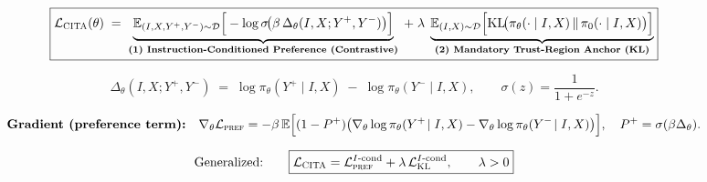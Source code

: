 


\vspace{-0.6em}
\begin{figure}[ht!]
\centering
\begin{tcolorbox}[
  enhanced,
  colback=white,
  colframe=black,
  boxrule=0.8pt,
  borderline={0.6pt}{1.6pt}{black},
  sharp corners,
  width=0.99\textwidth,
  left=3pt,
  right=3pt,
  top=3pt,
  bottom=2pt
]
\tiny

\[
\boxed{
\mathcal{L}_{\textsc{CITA}}(\theta)
\;=\;
\underbrace{
\mathbb{E}_{(I,X,Y^+,Y^-)\sim \mathcal{D}}
\Big[
-\log \sigma\!\big(\beta\,\Delta_\theta(I,X;Y^+,Y^-)\big)
\Big]
}_{\textbf{(1) Instruction-Conditioned Preference (Contrastive)}}
\;+\;
\lambda\;
\underbrace{
\mathbb{E}_{(I,X)\sim \mathcal{D}}
\Big[
\mathrm{KL}\!\big(\pi_\theta(\cdot\mid I,X)\,\|\,\pi_0(\cdot\mid I,X)\big)
\Big]
}_{\textbf{(2) Mandatory Trust-Region Anchor (KL)}}
}
\]

\vspace{-0.5em}

\[
\Delta_\theta(I,X;Y^+,Y^-)
\;=\;
\log \pi_\theta(Y^+\mid I,X)\;-\;\log \pi_\theta(Y^-\mid I,X),
\qquad
\sigma(z)=\frac{1}{1+e^{-z}}.
\]

\vspace{-0.6em}

\[
\textbf{Gradient (preference term):}\quad
\nabla_\theta \mathcal{L}_{\textsc{pref}}
=
-\beta\,
\mathbb{E}\Big[
(1-P^+)\big(\nabla_\theta \log \pi_\theta(Y^+\!\mid I,X)-\nabla_\theta \log \pi_\theta(Y^-\!\mid I,X)\big)
\Big],
\quad
P^+=\sigma(\beta\Delta_\theta).
\]

\vspace{-0.35em}

\[
\text{Generalized:}\qquad
\boxed{
\mathcal{L}_{\textsc{CITA}}
=
\mathcal{L}_{\textsc{pref}}^{I\text{-cond}}
+
\lambda\,\mathcal{L}_{\textsc{KL}}^{I\text{-cond}},
\qquad
\lambda>0
}
\]
\end{tcolorbox}


\end{figure}
